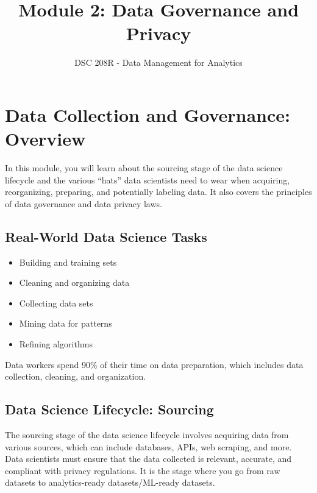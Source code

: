 \documentclass[12pt]{article}
\title{Module 2: Data Governance and Privacy}
\author{DSC 208R - Data Management for Analytics}
\date{}
\begin{document}
\maketitle



\section{Data Collection and Governance: Overview}

\begin{tcolorbox}[colback=blue!5!white,colframe=blue!75!black,title={Overview}]
    In this module, you will learn about the sourcing stage of the data science lifecycle and the various “hats” data scientists need to wear when acquiring, reorganizing, preparing, and potentially labeling data. It also covers the principles of data governance and data privacy laws.
\end{tcolorbox}

\subsection{Real-World Data Science Tasks}

\begin{itemize}
    \item Building and training sets
    \item Cleaning and organizing data
    \item Collecting data sets
    \item Mining data for patterns
    \item Refining algorithms
\end{itemize}

\parbox{\textwidth}{Data workers spend 90\% of their time on data preparation, which includes data collection, cleaning, and organization.}

\subsection{Data Science Lifecycle: Sourcing}

\begin{tcolorbox}[colback=green!5!white,colframe=green!75!black,title={What is Sourcing?}]
    The sourcing stage of the data science lifecycle involves acquiring data from various sources, which can include databases, APIs, web scraping, and more. Data scientists must ensure that the data collected is relevant, accurate, and compliant with privacy regulations. It is the stage where you go from raw datasets to analytics-ready datasets/ML-ready datasets.
\end{tcolorbox}
\end{document}
